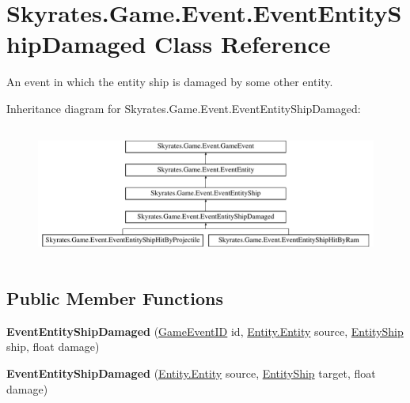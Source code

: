 \hypertarget{class_skyrates_1_1_game_1_1_event_1_1_event_entity_ship_damaged}{\section{Skyrates.\-Game.\-Event.\-Event\-Entity\-Ship\-Damaged Class Reference}
\label{class_skyrates_1_1_game_1_1_event_1_1_event_entity_ship_damaged}
}


An event in which the entity ship is damaged by some other entity.  


Inheritance diagram for Skyrates.\-Game.\-Event.\-Event\-Entity\-Ship\-Damaged\-:\begin{figure}[H]
\begin{center}
\leavevmode
\includegraphics[height=4.430379cm]{class_skyrates_1_1_game_1_1_event_1_1_event_entity_ship_damaged}
\end{center}
\end{figure}
\subsection*{Public Member Functions}
\begin{DoxyCompactItemize}
\item 
\hypertarget{class_skyrates_1_1_game_1_1_event_1_1_event_entity_ship_damaged_a05895097588c041bddeab2522c62ae72}{{\bfseries Event\-Entity\-Ship\-Damaged} (\hyperlink{namespace_skyrates_1_1_game_1_1_event_ad31565d2f03f234f8f77ebf23ff8f150}{Game\-Event\-I\-D} id, \hyperlink{class_skyrates_1_1_entity_1_1_entity}{Entity.\-Entity} source, \hyperlink{class_skyrates_1_1_entity_1_1_entity_ship}{Entity\-Ship} ship, float damage)}\label{class_skyrates_1_1_game_1_1_event_1_1_event_entity_ship_damaged_a05895097588c041bddeab2522c62ae72}

\item 
\hypertarget{class_skyrates_1_1_game_1_1_event_1_1_event_entity_ship_damaged_a59a159d16da809e827bc04ee15222782}{{\bfseries Event\-Entity\-Ship\-Damaged} (\hyperlink{class_skyrates_1_1_entity_1_1_entity}{Entity.\-Entity} source, \hyperlink{class_skyrates_1_1_entity_1_1_entity_ship}{Entity\-Ship} target, float damage)}\label{class_skyrates_1_1_game_1_1_event_1_1_event_entity_ship_damaged_a59a159d16da809e827bc04ee15222782}

\end{DoxyCompactItemize}
